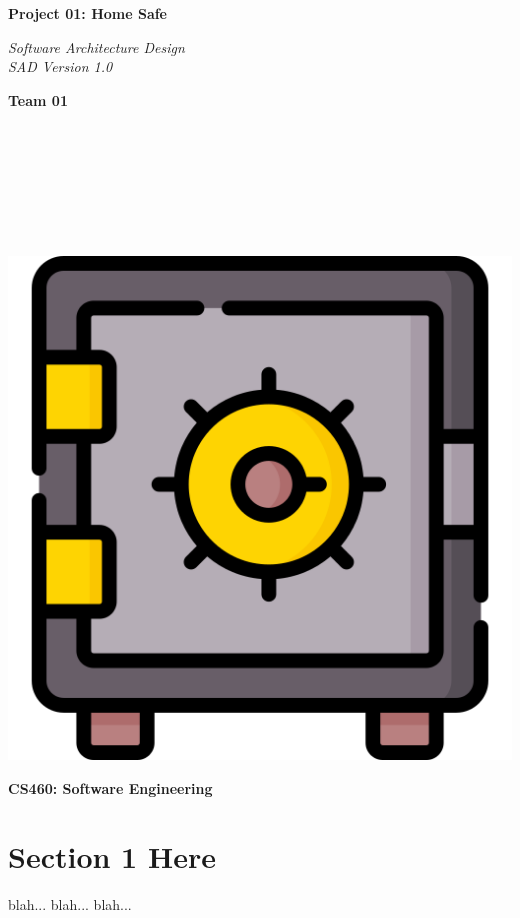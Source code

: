 \documentclass{article}
\begin{document}
\begin{titlepage}
\begin{center}
\vspace*{1cm}

\Huge
\textbf{Project 01: Home Safe}

\vspace{0.5cm}
\Large
\textit{Software Architecture Design} \\
\textit{SAD Version 1.0}

\vspace{1cm}

\textbf{Team 01}

\vspace{0.5cm}

 \\
 \\
 \\
 \\
 \\
 \\

\vspace{1cm}

\includegraphics[scale=0.25]{docs/figs/safe.png}\\[0.5cm]

\vspace{3.5cm}

\Large
\textbf{CS460: Software Engineering} \\

\end{center}
\end{titlepage}

\newpage

\tableofcontents

\newpage

\section{Section 1 Here}
blah... blah... blah...
\end{document}
